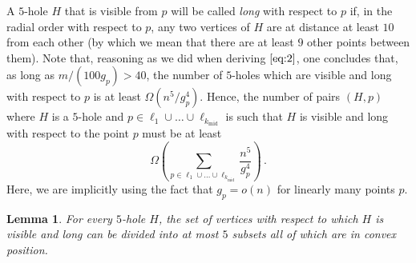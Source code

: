 \documentclass[12pt,reqno, a4paper]{amsart}
\newcounter{contSect} \numberwithin{contSect}{section}
\newtheorem{lemma}[contSect]{Lemma}
\begin{document}
A $5$-hole $H$ that is visible from $p$ will be called \textit{long} with respect to $p$ if, in the radial order with respect to $p$, any two vertices of $H$ are at distance at least $10$ from each other (by which we mean that there are at least $9$ other points between them). Note that, reasoning as we did when deriving $\eqref{eq:2}$, one concludes that, as long as $m/(100g_p)> 40$, the number of $5$-holes which are visible and long with respect to $p$ is at least $\Omega(n^{5}/g_{p}^4)$. Hence, the number of pairs $(H,p)$ where $H$ is a $5$-hole and $p\in \ell_1\cup\dots\cup\ell_{k_{\operatorname{mid}}}$ is such that $H$ is visible and long with respect to the point $p$ must be at least 
\begin{equation}\label{eq:4}
    \Omega\left(\sum_{p\in \ell_1\cup\dots\cup\ell_{k_{\operatorname{mid}}}} \frac{n^5}{g_p^4}\right)\,.
\end{equation}
Here, we are implicitly using the fact that $g_p=o(n)$ for linearly many points $p$.

\begin{lemma}\label{lem:visible_implies_convex}
 For every $5$-hole $H$, the set of vertices with respect to which $H$ is visible and long can be divided into at most $5$ subsets all of which are in convex position.
\end{lemma}
\end{document}
